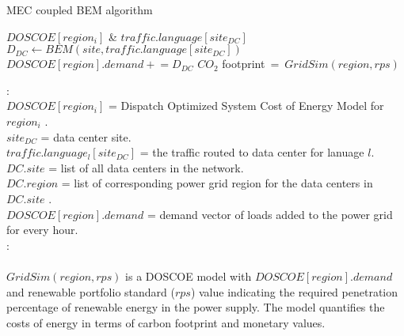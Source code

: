   \begin{algorithm}

    \caption{MEC coupled BEM algorithm}
    \begin{algorithmic}
      \REQUIRE $DOSCOE[region_i]$ \& $traffic.language[site_{DC}]$
        \STATE $D_{DC} \gets BEM(site, traffic.language[site_{DC}])$
        \STATE $DOSCOE[region].demand  \mathrel{+}=  D_{DC}$
        \ENDIF
      \ENDFOR
      \RETURN $CO_{2}$ {footprint}$\ =\ GridSim(region, rps)$
      
      \begin{small}
      \vspace{.1in}
      : \\
     
        \hspace{.2in} $DOSCOE[region_i]$ = Dispatch Optimized System Cost of Energy Model for $region_i$ \cite{platt17}.  \\
        \hspace{.2in} $site_{DC}$ = data center site. \\
        \hspace{.2in} $traffic.language_l[site_{DC}]$ = the traffic routed to data center for lanuage $l$.  \\
        \hspace{.2in} $DC.site$ = list of all data centers in the network. \\
        \hspace{.2in} $DC.region$ = list of corresponding power grid region for the data centers in $DC.site$ . \\
        \hspace{.2in}$DOSCOE[region].demand$ = demand vector of loads added to the power grid for every hour. \\
        \vspace{.1in}
        : \\
        \vspace{.05in}
        \hspace{.2in}{$BEM(site, traffic.language[site_{DC}])$ is a EnergyPlus model of the data center. As an external argument the traffic profile for the language to the data center is passed. The traffic profiles serve as coefficients for the IT load, bounded by 0 and 1.  The output is a vector indicating the building energy demands for each hour of the year.} \\
        \vspace{.05in}
        \hspace{.2in}$GridSim(region, rps)$ is a DOSCOE model with $DOSCOE[region].demand$ and renewable portfolio standard ($rps$) value indicating the required penetration percentage of renewable energy in the power supply. The model quantifies the costs of energy in terms of carbon footprint and monetary values. 
        \end{small}
    \end{algorithmic}
    \label{mec_coupled_bem_algo}

  \end{algorithm}